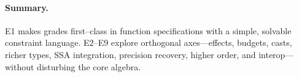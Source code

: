 \paragraph{Summary.}
\textsc{E1} makes grades first–class in function specifications with a simple, solvable constraint language.
\textsc{E2}–\textsc{E9} explore orthogonal axes—effects, budgets, casts, richer types, SSA integration, precision recovery, higher order, and interop—without disturbing the core algebra.
